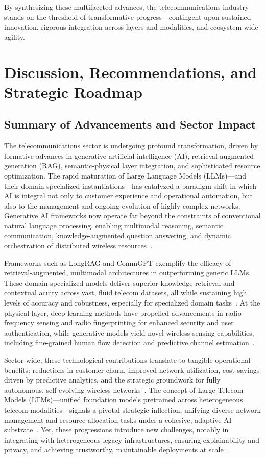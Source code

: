 \vspace{2em}
\noindent
By synthesizing these multifaceted advances, the telecommunications industry stands on the threshold of transformative progress—contingent upon sustained innovation, rigorous integration across layers and modalities, and ecosystem-wide agility.

\section{Discussion, Recommendations, and Strategic Roadmap}

\subsection{Summary of Advancements and Sector Impact}

The telecommunications sector is undergoing profound transformation, driven by formative advances in generative artificial intelligence (AI), retrieval-augmented generation (RAG), semantic-physical layer integration, and sophisticated resource optimization. The rapid maturation of Large Language Models (LLMs)—and their domain-specialized instantiations—has catalyzed a paradigm shift in which AI is integral not only to customer experience and operational automation, but also to the management and ongoing evolution of highly complex networks. Generative AI frameworks now operate far beyond the constraints of conventional natural language processing, enabling multimodal reasoning, semantic communication, knowledge-augmented question answering, and dynamic orchestration of distributed wireless resources~\cite{ref7,ref16}. 

Frameworks such as LongRAG and CommGPT exemplify the efficacy of retrieval-augmented, multimodal architectures in outperforming generic LLMs. These domain-specialized models deliver superior knowledge retrieval and contextual acuity across vast, fluid telecom datasets, all while sustaining high levels of accuracy and robustness, especially for specialized domain tasks~\cite{ref7,ref16}. At the physical layer, deep learning methods have propelled advancements in radio-frequency sensing and radio fingerprinting for enhanced security and user authentication, while generative models yield novel wireless sensing capabilities, including fine-grained human flow detection and predictive channel estimation~\cite{ref18,ref19,ref21}.

Sector-wide, these technological contributions translate to tangible operational benefits: reductions in customer churn, improved network utilization, cost savings driven by predictive analytics, and the strategic groundwork for fully autonomous, self-evolving wireless networks~\cite{ref16,ref46}. The concept of Large Telecom Models (LTMs)—unified foundation models pretrained across heterogeneous telecom modalities—signals a pivotal strategic inflection, unifying diverse network management and resource allocation tasks under a cohesive, adaptive AI substrate~\cite{ref16}. Yet, these progressions introduce new challenges, notably in integrating with heterogeneous legacy infrastructures, ensuring explainability and privacy, and achieving trustworthy, maintainable deployments at scale~\cite{ref7,ref16,ref17,ref18,ref46}.

